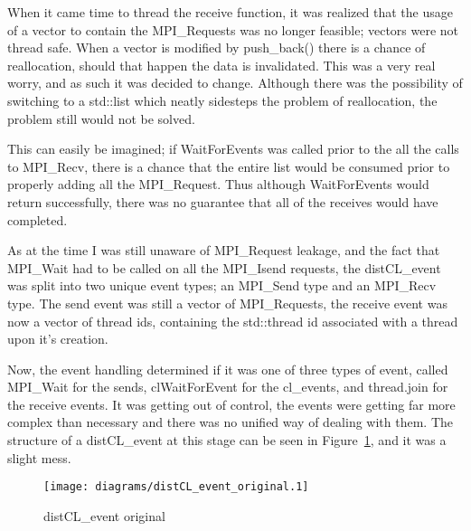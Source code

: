 \documentclass[report.tex]{subfiles}
\begin{document}
            When it came time to thread the receive function, it was realized that the usage of a vector to contain the MPI\_Requests was no longer feasible; vectors were not thread safe. When a vector is modified by push\_back() there is a chance of reallocation, should that happen the data is invalidated. This was a very real worry, and as such it was decided to change. Although there was the possibility of switching to a std::list which neatly sidesteps the problem of reallocation, the problem still would not be solved.

            This can easily be imagined; if WaitForEvents was called prior to the all the calls to MPI\_Recv, there is a chance that the entire list would be consumed prior to properly adding all the MPI\_Request. Thus although WaitForEvents would return successfully, there was no guarantee that all of the receives would have completed.

            As at the time I was still unaware of MPI\_Request leakage, and the fact that MPI\_Wait had to be called on all the MPI\_Isend requests, the distCL\_event was split into two unique event types; an MPI\_Send type and an MPI\_Recv type. The send event was still a vector of MPI\_Requests, the receive event was now a vector of thread ids, containing the std::thread id associated with a thread upon it's creation.

            Now, the event handling determined if it was one of three types of event, called MPI\_Wait for the sends, clWaitForEvent for the cl\_events, and thread.join for the receive events. It was getting out of control, the events were getting far more complex than necessary and there was no unified way of dealing with them. The structure of a distCL\_event at this stage can be seen in Figure~\ref{fig:distCL_event_uml_original}, and it was a slight mess.

            \begin{figure}[htbp]
                \centering
                \texttt{[image: diagrams/distCL\_event\_original.1]}
                \caption{distCL\_event original}
                \label{fig:distCL_event_uml_original}
            \end{figure}
            
        
\end{document}
